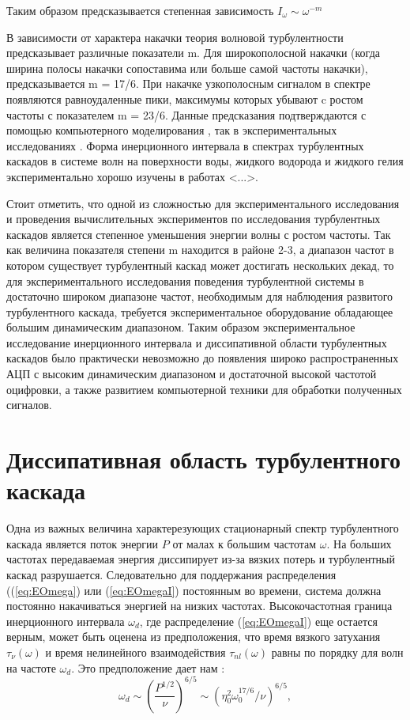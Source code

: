 Таким образом предсказывается степенная зависимость $I_\omega \sim \omega^{-m}$

В зависимости от характера накачки теория волновой турбулентности предсказывает различные показатели m. Для широкополосной накачки (когда ширина полосы накачки сопоставима или больше самой частоты накачки), предсказывается m = 17/6. При накачке узкополосным сигналом в спектре появляются равноудаленные пики, максимумы которых убывают c ростом частоты с показателем m = 23/6. Данные предсказания подтверждаются с помощью компьютерного моделирования \todo{[ссылки]}, так в экспериментальных исследованиях \cite{Brazhnikov_liq_hydr, Falcon2007}. Форма инерционного интервала в спектрах турбулентных каскадов в системе волн на поверхности воды, жидкого водорода и жидкого гелия экспериментально хорошо изучены в работах <...>. 

Стоит отметить, что одной из сложностью для экспериментального исследования и проведения вычислительных экспериментов по исследования турбулентных каскадов является степенное уменьшения энергии волны с ростом частоты. Так как величина показателя степени m находится в районе 2-3, а диапазон частот в котором существует турбулентный каскад может достигать нескольких декад, то для экспериментального исследования поведения турбулентной системы в достаточно широком диапазоне частот, необходимым для наблюдения развитого турбулентного каскада, требуется экспериментальное оборудование обладающее большим динамическим диапазоном. Таким образом экспериментальное исследование инерционного интервала и диссипативной области турбулентных каскадов было практически невозможно до появления широко распространенных АЦП с высоким динамическим диапазоном и достаточной высокой частотой оцифровки, а также развитием компьютерной техники для обработки полученных сигналов.

\section{Диссипативная область турбулентного каскада}%
Одна из важных величина характерезующих стационарный спектр турбулентного каскада является поток энергии $P$ от малах к большим частотам $\omega$. На больших частотах передаваемая энергия диссипирует из-за вязких потерь и турбулентный каскад разрушается. Следовательно для поддержания распределения ((\ref{eq:EOmega}) или (\ref{eq:EOmegaI}) постоянным во времени, система должна постоянно накачиваться энергией на низких частотах. Высокочастотная граница инерционного интервала $\omega_d$, где распределение (\ref{eq:EOmegaI}) еще остается верным, может быть оценена из предположения, что время вязкого затухания $\tau_\nu(\omega)$ и время нелинейного взаимодействия $\tau_{nl}(\omega)$ равны по порядку для волн на частоте $\omega_d$. Это предположение дает нам \cite{Malkin1984}:
\begin{equation}
\omega_d	 \sim (\frac{P^{1/2}}{\nu})^{6/5} \sim (\eta_0^2\omega_0^{17/6}/\nu)^{6/5},
\end{equation}

